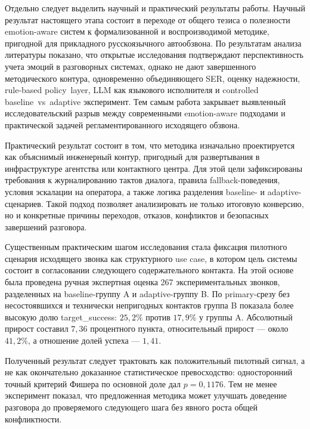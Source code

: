 \documentclass[a4paper,14pt]{extarticle}
\renewcommand{\texttt}[1]{\textnormal{#1}}
\begin{document}
Отдельно следует выделить научный и практический результаты работы.
Научный результат настоящего этапа состоит в переходе от общего тезиса о
полезности emotion-aware систем к формализованной и воспроизводимой
методике, пригодной для прикладного русскоязычного автообзвона. По
результатам анализа литературы показано, что открытые исследования
подтверждают перспективность учета эмоций в разговорных системах, однако
не дают завершенного методического контура, одновременно объединяющего
\texttt{SER}, оценку надежности, rule-based \texttt{policy\ layer},
\texttt{LLM} как языкового исполнителя и controlled
\texttt{baseline\ vs\ adaptive} эксперимент. Тем самым работа закрывает
выявленный исследовательский разрыв между современными emotion-aware
подходами и практической задачей регламентированного исходящего обзвона.

Практический результат состоит в том, что методика изначально
проектируется как объяснимый инженерный контур, пригодный для
развертывания в инфраструктуре агентства или контактного центра. Для
этой цели зафиксированы требования к журналированию тактов диалога,
правила \texttt{fallback}-поведения, условия эскалации на оператора, а
также логика разделения baseline- и adaptive-сценариев. Такой подход
позволяет анализировать не только итоговую конверсию, но и конкретные
причины переходов, отказов, конфликтов и безопасных завершений
разговора.

Существенным практическим шагом исследования стала фиксация пилотного
сценария исходящего звонка как структурного use case, в котором цель
системы состоит в согласовании следующего содержательного контакта. На
этой основе была проведена ручная экспертная оценка 267
экспериментальных звонков, разделенных на baseline-группу \texttt{A} и
adaptive-группу \texttt{B}. По primary-срезу без несостоявшихся и
технически непригодных контактов группа \texttt{B} показала более
высокую долю \texttt{target\_\allowbreak{}success}: \(25{,}2\%\) против \(17{,}9\%\)
у группы \texttt{A}. Абсолютный прирост составил \(7{,}36\) процентного
пункта, относительный прирост --- около \(41{,}2\%\), а отношение долей
успеха --- \(1{,}41\).

Полученный результат следует трактовать как положительный пилотный
сигнал, а не как окончательно доказанное статистическое превосходство:
односторонний точный критерий Фишера по основной доле дал
\(p = 0{,}1176\). Тем не менее эксперимент показал, что предложенная
методика может улучшать доведение разговора до проверяемого следующего
шага без явного роста общей конфликтности.
\end{document}
